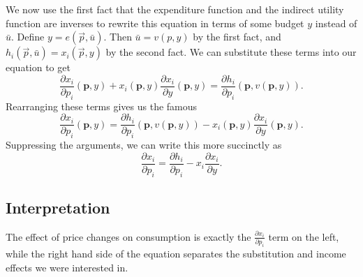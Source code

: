 We now use the first fact that the expenditure function and the indirect utility function are inverses to rewrite this equation in terms of some budget $y$ instead of $\bar{u}$. Define $y = e(\vec{p}, \bar{u})$. Then $\bar{u} = v(p, y)$ by the first fact, and $h_i(\vec{p}, \bar{u}) = x_i(\vec{p}, y)$ by the second fact. We can substitute these terms into our equation to get 
$$\frac{\partial x_{i}}{\partial p_{i}}(\mathbf{p}, y)+x_{i}(\mathbf{p}, y) \frac{\partial x_{i}}{\partial y}(\mathbf{p}, y)=\frac{\partial h_{i}}{\partial p_{i}}(\mathbf{p}, v(\mathbf{p}, y)).$$
Rearranging these terms gives us the famous 
$$
\boxed{\frac{\partial x_{i}}{\partial p_{i}}(\mathbf{p}, y)=\frac{\partial h_{i}}{\partial p_{i}}(\mathbf{p}, v(\mathbf{p}, y))-x_{i}(\mathbf{p}, y) \frac{\partial x_{i}}{\partial y}(\mathbf{p}, y).}
$$
Suppressing the arguments, we can write this more succinctly as 
$$\frac{\partial x_{i}}{\partial p_{i}}=\frac{\partial h_{i}}{\partial p_{i}}-x_{i} \frac{\partial x_{i}}{\partial y}.$$

\subsection*{Interpretation}
The effect of price changes on consumption is exactly the $\frac{\partial x_{i}}{\partial p_{i}}$ term on the left, while the right hand side of the equation separates the substitution and income effects we were interested in. 

